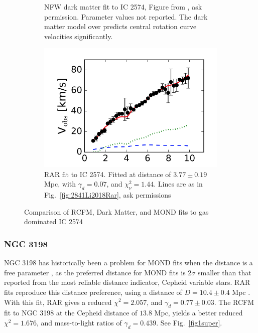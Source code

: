 \documentclass[reprint,%
 amsmath,amssymb,
 aps,
]{revtex4-1}
\begin{document}
\begin{figure}[ht]
\begin{subfigure}[b]{0.5\linewidth}
    \caption{NFW dark matter fit to IC 2574, Figure from \cite{2017MNRAS.471.1841N}, ask permission. Parameter values not reported.  The dark matter model over predicts central rotation curve velocities significantly.} 
    \label{fig:Nav17} 
    \vspace{4ex}
  \end{subfigure} 
    \begin{subfigure}[b]{0.5\linewidth}
    \centering
    \includegraphics[width=0.95\linewidth]{figures/IC2574_Li.png} 
    \caption{  RAR fit to IC 2574. Fitted at distance of $3.77 \pm 0.19$ Mpc, with $\gamma_d =0.07 $, and   $\chi^2_\nu = 1.44$.  Lines are as in Fig.~\ref{fig:2841Li2018Rar}, ask permissions \cite{Li_2018}   } 
    \label{fig:Nav17} 
    \vspace{4ex}
  \end{subfigure} 
  \caption{ Comparison of RCFM, Dark Matter, and MOND
fits to   gas dominated IC 2574  }
  \label{fig:CompareIC2574} 
\end{figure}

\subsubsection{NGC 3198}

  NGC 3198 has historically been a problem  for MOND fits when the distance is a free parameter
\cite{Gent}, as the preferred distance for MOND fits is 2$\sigma$ smaller than that reported from  the most reliable distance indicator, Cepheid variable stars. RAR fits reproduce this distance preference, using a distance of
$ D = 10.4 \pm 0.4$ Mpc  \cite{Li_2018}. With this fit,  RAR gives a reduced
$\chi^2 = 2.057$, and $\gamma_d = 0.77 \pm 0.03$. The RCFM fit to  NGC 3198 at the Cepheid  distance  of 
$13.8$ Mpc, yields  a better reduced $\chi^2 = 1.676$, and mass-to-light ratios of  $\gamma_d = 0.439$.   See Fig.~\ref{fig1super}. 
\end{document}
